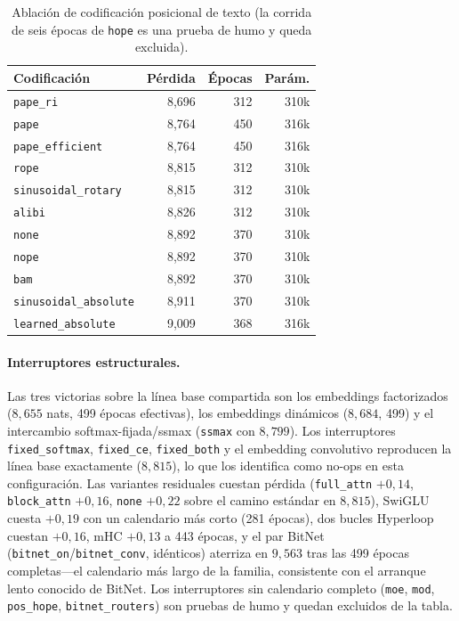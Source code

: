 \begin{table}[H]
\centering
\small
\caption{Ablación de codificación posicional de texto (la corrida de seis épocas de \texttt{hope} es una prueba de humo y queda excluida).}
\label{tab:r3-pe}
\begin{tabular}{lrrr}
\toprule
Codificación & Pérdida & Épocas & Parám. \\
\midrule
\texttt{pape\_ri} & 8,696 & 312 & 310k \\
\texttt{pape} & 8,764 & 450 & 316k \\
\texttt{pape\_efficient} & 8,764 & 450 & 316k \\
\texttt{rope} & 8,815 & 312 & 310k \\
\texttt{sinusoidal\_rotary} & 8,815 & 312 & 310k \\
\texttt{alibi} & 8,826 & 312 & 310k \\
\texttt{none} & 8,892 & 370 & 310k \\
\texttt{nope} & 8,892 & 370 & 310k \\
\texttt{bam} & 8,892 & 370 & 310k \\
\texttt{sinusoidal\_absolute} & 8,911 & 370 & 310k \\
\texttt{learned\_absolute} & 9,009 & 368 & 316k \\
\bottomrule
\end{tabular}
\end{table}

\paragraph{Interruptores estructurales.}
Las tres victorias sobre la línea base compartida son los embeddings factorizados ($8,655$ nats, 499 épocas efectivas), los embeddings dinámicos ($8,684$, 499) y el intercambio softmax-fijada/ssmax (\texttt{ssmax} con $8,799$). Los interruptores \texttt{fixed\_softmax}, \texttt{fixed\_ce}, \texttt{fixed\_both} y el embedding convolutivo reproducen la línea base exactamente ($8,815$), lo que los identifica como no-ops en esta configuración. Las variantes residuales cuestan pérdida (\texttt{full\_attn} $+0,14$, \texttt{block\_attn} $+0,16$, \texttt{none} $+0,22$ sobre el camino estándar en $8,815$), SwiGLU cuesta $+0,19$ con un calendario más corto (281 épocas), dos bucles Hyperloop cuestan $+0,16$, mHC $+0,13$ a 443 épocas, y el par BitNet (\texttt{bitnet\_on}/\texttt{bitnet\_conv}, idénticos) aterriza en $9,563$ tras las 499 épocas completas---el calendario más largo de la familia, consistente con el arranque lento conocido de BitNet. Los interruptores sin calendario completo (\texttt{moe}, \texttt{mod}, \texttt{pos\_hope}, \texttt{bitnet\_routers}) son pruebas de humo y quedan excluidos de la tabla.

